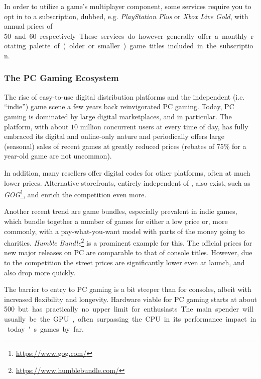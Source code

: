 In order to utilize a game's multiplayer component, some services require you to opt in to a subscription, dubbed, e.g. \textit{PlayStation Plus} or \textit{Xbox Live Gold}, with annual prices of \SI{50}[\EUR] and \SI{60}[\EUR] respectively. These services do however generally offer a monthly rotating palette of (older or smaller) game titles included in the subscription.



\subsubsection{The PC Gaming Ecosystem}

The rise of easy-to-use digital distribution platforms and the independent (i.e. ``indie'') game scene a few years back reinvigorated PC gaming. Today, PC gaming is dominated by large digital marketplaces, and \steam in particular. The platform, with about $10$ million concurrent users at every time of day, has fully embraced its digital and online-only nature and periodically offers large (seasonal) sales of recent games at greatly reduced prices (rebates of 75\% for a year-old game are not uncommon). 

In addition, many resellers offer digital codes for other platforms, often at much lower prices. Alternative storefronts, entirely independent of \steam, also exist, such as \textit{GOG}\footnote{\url{https://www.gog.com/}}, and enrich the competition even more.

Another recent trend are game bundles, especially prevalent in indie games, which bundle together a number of games for either a low price or, more commonly, with a pay-what-you-want model with parts of the money going to charities. \textit{Humble Bundle}\footnote{\url{https://www.humblebundle.com/}} is a prominent example for this. The official prices for new major releases on PC are comparable to that of console titles. However, due to the competition the street prices are significantly lower even at launch, and also drop more quickly.

The barrier to entry to PC gaming is a bit steeper than for consoles, albeit with increased flexibility and longevity. Hardware viable for PC gaming starts at about \SI{500}[\EUR] but has practically no upper limit for enthusiasts. The main spender will usually be the \gls{GPU}, often surpassing the \acrshort{CPU} in its performance impact in today's games by far.

